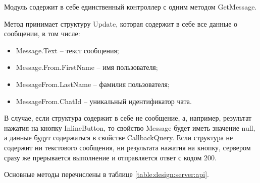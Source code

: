 Модуль содержит в себе единственный контроллер с одним методом GetMessage.

Метод принимает структуру Update, которая содержит в себе все данные о сообщении, в том числе:

\begin{itemize}
	\item Message.Text – текст сообщения;
	\item Message.From.FirstName – имя пользователя;
	\item MessageFrom.LastName – фамилия пользователя;
	\item MessageFrom.ChatId – уникальный идентификатор чата.
\end{itemize}

В случае, если структура содержит в себе не сообщение, а, например, результат нажатия на кнопку InlineButton, то свойство Message будет иметь значение null, а данные будут содержаться в свойстве CallbackQuery.
Если структура не содержит ни текстового сообщения, ни результата нажатия на кнопку, сервером сразу же прерывается выполнение и отправляется ответ с кодом 200.

Основные методы перечислены в таблице \ref{table:design:server:api}.

